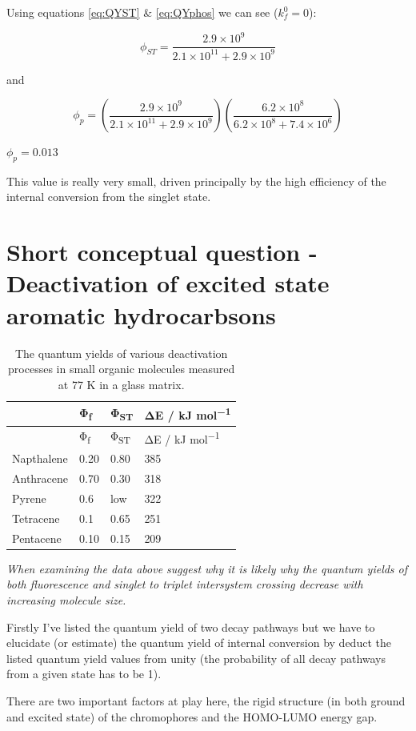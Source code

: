 \documentclass[
]{book}
\begin{document}
Using equations \eqref{eq:QYST} \& \eqref{eq:QYphos} we can see (\(k_f^0=0\)):

\begin{equation*}
\phi_{ST} = \frac{2.9 × 10^9}{2.1 × 10^{11}+2.9 × 10^9}
\end{equation*}

and

\begin{equation*}
\phi_p = \left(\frac{2.9 × 10^9}{2.1 × 10^{11}+2.9 × 10^9}\right)\left(\frac{6.2 × 10^8}{6.2 × 10^8+ 7.4 × 10^6}\right)
\end{equation*}

\(\phi_p=0.013\)

This value is really very small, driven principally by the high efficiency of the internal conversion from the singlet state.

\hypertarget{sec:exhydrocarbons}{%
\section{Short conceptual question - Deactivation of excited state aromatic hydrocarbsons}\label{sec:exhydrocarbons}}

\begin{longtable}[]{@{}llll@{}}
\caption{\label{tab:smallmolQY} The quantum yields of various deactivation processes in small organic molecules measured at 77 K in a glass matrix.}\tabularnewline
\toprule
& Φ\textsubscript{f} & Φ\textsubscript{ST} & ΔE / kJ mol\textsuperscript{−1}\tabularnewline
\midrule
\endfirsthead
\toprule
& Φ\textsubscript{f} & Φ\textsubscript{ST} & ΔE / kJ mol\textsuperscript{−1}\tabularnewline
\midrule
\endhead
Napthalene & 0.20 & 0.80 & 385\tabularnewline
Anthracene & 0.70 & 0.30 & 318\tabularnewline
Pyrene & 0.6 & low & 322\tabularnewline
Tetracene & 0.1 & 0.65 & 251\tabularnewline
Pentacene & 0.10 & 0.15 & 209\tabularnewline
\bottomrule
\end{longtable}

\emph{When examining the data above suggest why it is likely why the quantum yields of both fluorescence and singlet to triplet intersystem crossing decrease with increasing molecule size.}

Firstly I've listed the quantum yield of two decay pathways but we have to elucidate (or estimate) the quantum yield of internal conversion by deduct the listed quantum yield values from unity (the probability of all decay pathways from a given state has to be 1).

There are two important factors at play here, the rigid structure (in both ground and excited state) of the chromophores and the HOMO-LUMO energy gap.
\end{document}
